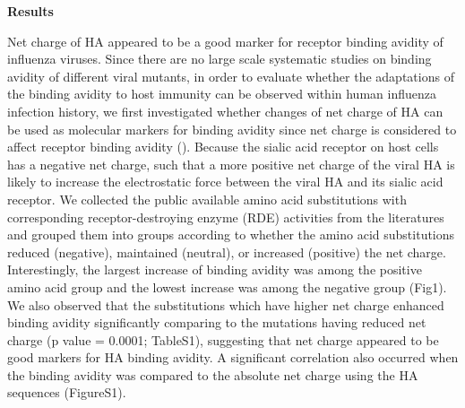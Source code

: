 \documentclass[12pt,a4paper]{article}
\begin{document}



{\bf Results}

Net charge of HA appeared to be a good marker for receptor binding avidity of influenza viruses.  Since there are no large scale systematic studies on binding avidity of different viral mutants, in order to evaluate whether the adaptations of the binding avidity to host immunity can be observed within human influenza infection history, we first investigated whether changes of net charge of HA can be used as molecular markers for binding avidity since net charge is considered to affect receptor binding avidity (\cite{Arinaminpathy2010}). Because the sialic acid receptor on host cells has a negative net charge, such that a more positive net charge of the viral HA is likely to increase the electrostatic force between the viral HA and its sialic acid receptor. We collected the public available amino acid substitutions with corresponding receptor-destroying enzyme (RDE) activities from the literatures and grouped them into groups according to whether the amino acid substitutions reduced (negative), maintained (neutral), or increased (positive) the net charge. Interestingly, the largest increase of binding avidity was among the positive amino acid group and the lowest increase was among the negative group (Fig1).  We also observed that the substitutions which have higher net charge enhanced binding avidity significantly comparing to the mutations having reduced net charge (p value = 0.0001; TableS1), suggesting that net charge appeared to be good markers for HA binding avidity. A significant correlation also occurred when the binding avidity was compared to the absolute net charge using the HA sequences (FigureS1). \\
\end{document}
